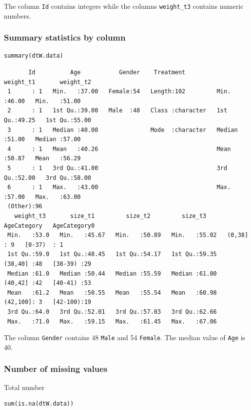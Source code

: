 \documentclass{article}
\begin{document}
The column \texttt{Id} contains integers while the columns \texttt{weight\_t3}
contains numeric numbers.

\subsubsection{Summary statistics by column}
\label{sec:orgbaf8d03}
\lstset{language=r,label= ,caption= ,captionpos=b,numbers=none}
\begin{lstlisting}
summary(dtW.data)
\end{lstlisting}

\begin{verbatim}
       Id          Age           Gender    Treatment           weight_t1       weight_t2    
 1      : 1   Min.   :37.00   Female:54   Length:102         Min.   :46.00   Min.   :51.00  
 2      : 1   1st Qu.:39.00   Male  :48   Class :character   1st Qu.:49.25   1st Qu.:55.00  
 3      : 1   Median :40.00               Mode  :character   Median :51.00   Median :57.00  
 4      : 1   Mean   :40.26                                  Mean   :50.87   Mean   :56.29  
 5      : 1   3rd Qu.:41.00                                  3rd Qu.:52.00   3rd Qu.:58.00  
 6      : 1   Max.   :43.00                                  Max.   :57.00   Max.   :63.00  
 (Other):96                                                                                 
   weight_t3       size_t1         size_t2         size_t3        AgeCategory   AgeCategory0
 Min.   :53.0   Min.   :45.67   Min.   :50.89   Min.   :55.02   (0,38]  : 9   [0-37)  : 1   
 1st Qu.:59.0   1st Qu.:48.45   1st Qu.:54.17   1st Qu.:59.35   (38,40] :48   [38-39) :29   
 Median :61.0   Median :50.44   Median :55.59   Median :61.00   (40,42] :42   [40-41) :53   
 Mean   :61.2   Mean   :50.55   Mean   :55.54   Mean   :60.98   (42,100]: 3   [42-100):19   
 3rd Qu.:64.0   3rd Qu.:52.01   3rd Qu.:57.03   3rd Qu.:62.66                               
 Max.   :71.0   Max.   :59.15   Max.   :61.45   Max.   :67.06
\end{verbatim}

The column \texttt{Gender} contains 48 \texttt{Male} and 54 \texttt{Female}. The median
value of \texttt{Age} is 40.

\subsubsection{Number of missing values}
\label{sec:org512d184}

Total number
\lstset{language=r,label= ,caption= ,captionpos=b,numbers=none}
\begin{lstlisting}
sum(is.na(dtW.data))
\end{lstlisting}
\end{document}
